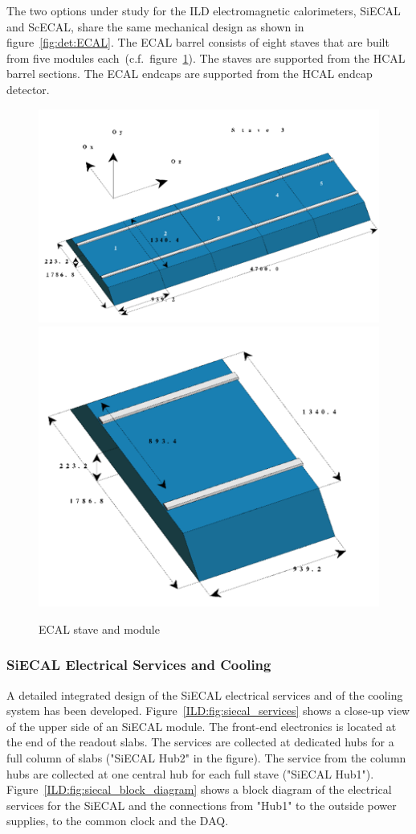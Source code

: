 The two options under study for the ILD electromagnetic calorimeters, SiECAL and ScECAL, share the same mechanical design as shown in figure~\ref{fig:det:ECAL}. The ECAL barrel consists of eight staves that are built from five modules each~(c.f.~figure~\ref{ILD:fig:ECAL_Mechanics}). The staves are supported from the HCAL barrel sections. The ECAL endcaps are supported from the HCAL endcap detector.
\begin{figure}[h]
    \centering
        \includegraphics[width=0.5\hsize]{Integration/fig/ECAL_Stave.png}
        \includegraphics[width=0.3\hsize]{Integration/fig/ECAL_Module.png}
    \caption{ECAL stave and module~\cite{ild:bib:SiECAL_ICD}}
    \label{ILD:fig:ECAL_Mechanics}
\end{figure}

\subsubsection{SiECAL Electrical Services and Cooling}

A detailed integrated design of the SiECAL electrical services and of the cooling system has been developed. Figure~\ref{ILD:fig:siecal_services} shows a close-up view of the upper side of an SiECAL module. The front-end electronics is located at the end of the readout slabs. The services are collected at dedicated hubs for a full column of slabs ("SiECAL Hub2" in the figure). The service from the column hubs are collected at one central hub for each full stave ("SiECAL Hub1"). Figure~\ref{ILD:fig:siecal_block_diagram} shows a block diagram of the electrical services for the SiECAL and the connections from "Hub1" to the outside power supplies, to the common clock and the DAQ. 


